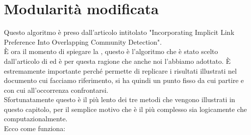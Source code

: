 \section{Modularità modificata}
Questo algoritmo è preso dall'articolo intitolato "Incorporating Implicit Link Preference Into Overlapping Community Detection".\\
È ora il momento di spiegare la \mmod, questo è l'algoritmo che è stato scelto dall'articolo di \cnrl ed è per questa ragione che anche noi l'abbiamo adottato. È estremamente importante perché permette di replicare i risultati illustrati nel documento cui facciamo riferimento, si ha quindi un punto fisso da cui partire e con cui all'occorrenza confrontarsi.\\
Sfortunatamente questo è il più lento dei tre metodi che vengono illustrati in questo capitolo, per il semplice motivo che è il più complesso sia logicamente che computazionalmente.\\
Ecco come funziona:

